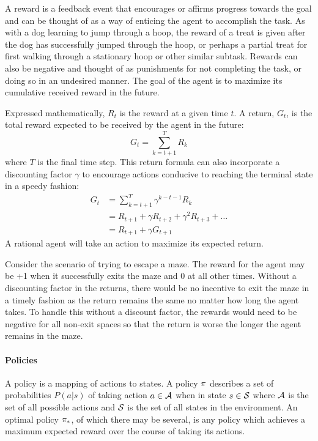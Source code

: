 A reward is a feedback event that encourages or affirms progress
towards the goal
and 
can be thought of as a way of enticing the agent to accomplish the task.
%
As with a dog learning to jump through a hoop,
the reward of a treat is given after the dog has successfully jumped
through the hoop,
or perhaps a partial treat for first walking through a stationary hoop
or other similar subtask.
%
Rewards can also be negative
and thought of as punishments for not completing the task,
or doing so in an undesired manner.
%
The goal of the agent is to maximize its cumulative received reward
in the future.

Expressed mathematically, $R_t$ is the reward at a given time $t$.
%
A return, $G_t$, is the total reward expected to be received by the agent
in the future:
\[
	G_t = \sum_{k=t+1}^{T} R_k
\]
where $T$ is the final time step.
%
This return formula can also incorporate a discounting factor $\gamma$ to
encourage actions conducive to reaching the terminal state in a speedy fashion:
\begin{align*}
	G_t &= \sum_{k=t+1}^{T} \gamma^{k-t-1} R_k \\
		&= R_{t+1} + \gamma R_{t+2} + \gamma^2 R_{t+3} + \ldots \\
		&= R_{t+1} + \gamma G_{t+1}
\end{align*}
%
A rational agent will take an action to maximize its expected return.

Consider the scenario of trying to escape a maze.
%
The reward for the agent may be +1 when it successfully exits the maze
and 0 at all other times.
%
Without a discounting factor in the returns,
there would be no incentive to exit the maze in a timely fashion
as the return remains the same no matter how long the agent takes.
%
To handle this without a discount factor,
the rewards would need to be negative for all non-exit spaces
so that the return is worse the longer the agent remains in the maze.


\paragraph*{Policies}

A policy is a mapping of actions to states.
%
A policy $\pi$ describes a set of probabilities $P(a|s)$
of taking action $a \in \mathcal{A}$
when in state $s \in \mathcal{S}$
where $\mathcal{A}$ is the set of all possible actions
and $\mathcal{S}$ is the set of all states in the environment.
%
An optimal policy $\pi_*$,
of which there may be several,
is any policy which achieves a maximum expected reward over the course of
taking its actions.

